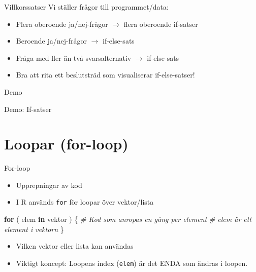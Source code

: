 \documentclass[
  11pt,
  ignorenonframetext,
]{beamer}
\newenvironment{Shaded}{\begin{snugshade}}{\end{snugshade}}
\newcommand{\CommentTok}[1]{\textcolor[rgb]{0.56,0.35,0.01}{\textit{#1}}}
\newcommand{\ControlFlowTok}[1]{\textcolor[rgb]{0.13,0.29,0.53}{\textbf{#1}}}
\newcommand{\NormalTok}[1]{#1}
\providecommand{\tightlist}{%
  \setlength{\itemsep}{0pt}\setlength{\parskip}{0pt}}
\begin{document}
\begin{frame}{Villkorssatser}
  Vi ställer frågor till programmet/data:
  \begin{itemize}
  \item
    Flera oberoende ja/nej-frågor $\rightarrow$ flera oberoende if-satser
  \item
    Beroende ja/nej-frågor $\rightarrow$ if-else-sats
  \item
    Fråga med fler än två svarsalternativ $\rightarrow$ if-else-sats
  \item
    Bra att rita ett beslutsträd som visualiserar if-else-satser!
  \end{itemize}

\end{frame}


\begin{frame}{Demo}
\label{demo}
\begin{block}{Demo: If-satser}
\label{demo-if-satser}
\end{block}
\end{frame}

\section{Loopar (for-loop)}\label{loopar-for-loop}

\begin{frame}[fragile]{For-loop}
\label{for-loop}
\begin{itemize}
\tightlist
\item
  Upprepningar av kod
\item
  I R används \texttt{for} för loopar över vektor/lista
\end{itemize}

\begin{Shaded}
\begin{Highlighting}[]
\ControlFlowTok{for}\NormalTok{ ( elem }\ControlFlowTok{in}\NormalTok{ vektor ) \{}
  \CommentTok{\# Kod som anropas en gång per element}
  \CommentTok{\# elem är ett element i vektorn}
\NormalTok{\}}
\end{Highlighting}
\end{Shaded}

\begin{itemize}
\tightlist
\item
  Vilken vektor eller lista kan användas
\item
  Viktigt koncept: Loopens index (\texttt{elem}) är det ENDA som ändras
  i loopen.
\end{itemize}
\end{frame}
\end{document}
